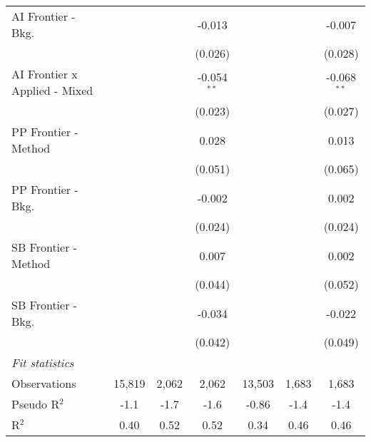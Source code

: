 \begin{tabular}{lcccccc}
   AI Frontier - Bkg.            &         &                & -0.013        &              &              & -0.007\\   
                                 &         &                & (0.026)       &              &              & (0.028)\\   
   AI Frontier x Applied - Mixed &         &                & -0.054$^{**}$ &              &              & -0.068$^{**}$\\   
                                 &         &                & (0.023)       &              &              & (0.027)\\   
   PP Frontier - Method          &         &                & 0.028         &              &              & 0.013\\   
                                 &         &                & (0.051)       &              &              & (0.065)\\   
   PP Frontier - Bkg.            &         &                & -0.002        &              &              & 0.002\\   
                                 &         &                & (0.024)       &              &              & (0.024)\\   
   SB Frontier - Method          &         &                & 0.007         &              &              & 0.002\\   
                                 &         &                & (0.044)       &              &              & (0.052)\\   
   SB Frontier - Bkg.            &         &                & -0.034        &              &              & -0.022\\   
                                 &         &                & (0.042)       &              &              & (0.049)\\   
   \midrule
   \emph{Fit statistics}\\
   Observations                  & 15,819  & 2,062          & 2,062         & 13,503       & 1,683        & 1,683\\  
   Pseudo R$^2$                  & -1.1    & -1.7           & -1.6          & -0.86        & -1.4         & -1.4\\  
   R$^2$                         & 0.40    & 0.52           & 0.52          & 0.34         & 0.46         & 0.46\\  
   

\end{tabular}
